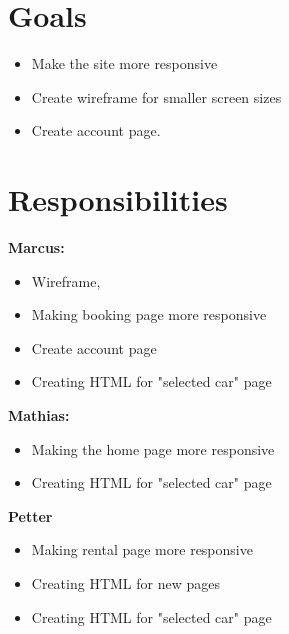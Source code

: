 \documentclass[a4paper,12pt]{article}
\begin{document}
\section{\textbf{Goals}}
\begin{itemize}
    \item Make the site more responsive
    \item Create wireframe for smaller screen sizes
    \item Create account page.
\end{itemize}

\section{Responsibilities}
\textbf{Marcus:}
\begin{itemize}
    \item Wireframe, 
    \item Making booking page more responsive
    \item Create account page
    \item     Creating HTML for "selected car" page
\end{itemize}
\textbf{Mathias:}
\begin{itemize}
    \item Making the home page more responsive
    \item Creating HTML for "selected car" page
\end{itemize}
\textbf{Petter}
\begin{itemize}
    \item Making rental page more responsive
    \item Creating HTML for new pages
    \item     Creating HTML for "selected car" page
\end{itemize}
\end{document}
